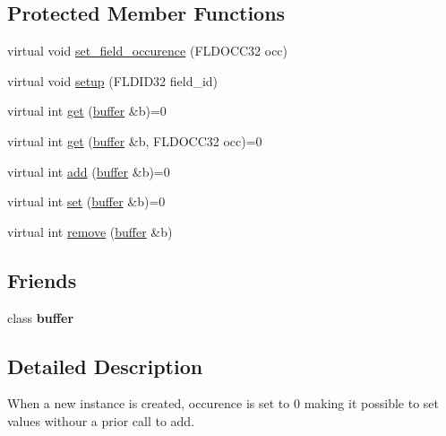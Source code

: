 \subsection*{Protected Member Functions}
\begin{DoxyCompactItemize}
\item 
virtual void \hyperlink{classatmi_1_1field_a83412cd9df383c342b5feb195090c9d9}{set\+\_\+field\+\_\+occurence} (F\+L\+D\+O\+C\+C32 occ)
\item 
virtual void \hyperlink{classatmi_1_1field_a9ca5e61e3e1068770098d20ad1332f24}{setup} (F\+L\+D\+I\+D32 field\+\_\+id)
\item 
virtual int \hyperlink{classatmi_1_1field_aae2d3df756e816b5db8f729039a59a51}{get} (\hyperlink{classatmi_1_1buffer}{buffer} \&b)=0
\item 
virtual int \hyperlink{classatmi_1_1field_a56ce53fabe290b94463f87936515ec46}{get} (\hyperlink{classatmi_1_1buffer}{buffer} \&b, F\+L\+D\+O\+C\+C32 occ)=0
\item 
virtual int \hyperlink{classatmi_1_1field_a5441bc87ba4bc3e9eb37c6db6a29688f}{add} (\hyperlink{classatmi_1_1buffer}{buffer} \&b)=0
\item 
virtual int \hyperlink{classatmi_1_1field_a41bb209965d627d2e67c839bece5372c}{set} (\hyperlink{classatmi_1_1buffer}{buffer} \&b)=0
\item 
virtual int \hyperlink{classatmi_1_1field_a783484fe641f66f5773f9eed7fd4be39}{remove} (\hyperlink{classatmi_1_1buffer}{buffer} \&b)
\end{DoxyCompactItemize}
\subsection*{Friends}
\begin{DoxyCompactItemize}
\item 
\hypertarget{classatmi_1_1field_afecbc2840248040e50fecb7164f912a9}{class {\bfseries buffer}}\label{classatmi_1_1field_afecbc2840248040e50fecb7164f912a9}

\end{DoxyCompactItemize}


\subsection{Detailed Description}
When a new instance is created, occurence is set to 0 making it possible to set values withour a prior call to add. 

